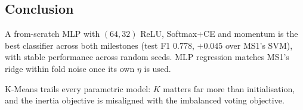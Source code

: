 \documentclass[10pt,twocolumn,a4paper]{article}
\begin{document}
\begin{table}[h!]
\centering
\caption{Selected configurations and test-set performance across the
two milestones. Reg: MSE (lower = better); Clf: accuracy /
macro-F1 (higher = better). Best of each task in bold.
\textit{km++${\times}10$} denotes K-Means++ seeding with $10$ restarts.}
\label{tab:final}
\end{table}


\subsection{Conclusion}
\label{sec:conclusion}
A from-scratch MLP with $(64,32)$ ReLU, Softmax+CE and momentum is
the best classifier across both milestones (test F1
$\mathbf{0.778}$, $+0.045$ over MS1's SVM), with stable performance
across random seeds. MLP regression matches MS1's ridge within fold
noise once its own $\eta$ is used.



K-Means trails every parametric model: $K$ matters far more than
initialisation, and the inertia objective is misaligned with the
imbalanced voting objective.
\end{document}
